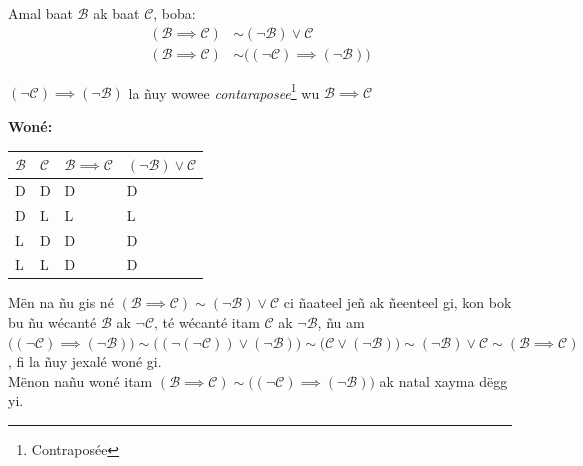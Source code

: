 \documentclass[twoside, a4paper]{article}
\begin{document}
\begin{tcolorbox}[enhanced jigsaw,breakable,pad at break*=1mm, colback=blue!5!white,colframe=white!75!black,title= Tèg\footnote{Proposition},
  watermark color=white]
Amal baat $\mathcal{B}$ ak baat $\mathcal{C}$, boba:
\begin{align*}
    (\mathcal{B} \implies \mathcal{C}) &\sim (\neg\mathcal{B}) \lor \mathcal{C} \\
    (\mathcal{B} \implies \mathcal{C}) &\sim \big( (\neg\mathcal{C}) \implies (\neg \mathcal{B}) \big)
\end{align*} 

$(\neg\mathcal{C}) \implies (\neg \mathcal{B})$ la ñuy wowee \textit{contaraposee}\footnote{Contraposée} wu $\mathcal{B} \implies \mathcal{C}$
\end{tcolorbox}

\textbf{Woné:}

\begin{tabularx}{0.8\textwidth} { 
  | >{\centering\arraybackslash}X 
  | >{\centering\arraybackslash}X 
  | >{\centering\arraybackslash}X 
  | >{\centering\arraybackslash}X |}
 \hline
$\mathcal{B}$&$\mathcal{C}$ & $\mathcal{B}\implies\mathcal{C}$ &$(\neg\mathcal{B}) \lor \mathcal{C}$\\
 \hline
 D  & D & D & D \\
 D  & L & L & L\\
 L  & D & D & D\\
 L  & L & D & D\\
\hline
\end{tabularx}
\vskip 0.5cm
Mën na ñu gis né $(\mathcal{B} \implies \mathcal{C}) \sim (\neg\mathcal{B}) \lor \mathcal{C}$ ci ñaateel jeñ ak ñeenteel gi, kon bok bu ñu wécanté $\mathcal{B}$ ak $\neg \mathcal{C}$, té wécanté itam $\mathcal{C}$ ak $\neg\mathcal{B}$, ñu am $\big( (\neg\mathcal{C}) \implies (\neg \mathcal{B}) \big) \sim \big( (\neg(\neg\mathcal{C})) \lor (\neg\mathcal{B})\big) \sim \big(\mathcal{C} \lor (\neg\mathcal{B}) \big)\sim (\neg\mathcal{B}) \lor \mathcal{C} \sim (\mathcal{B} \implies \mathcal{C})$, fi la ñuy jexalé woné gi.\\

Mënon nañu woné itam 
$(\mathcal{B} \implies \mathcal{C}) \sim \big( (\neg\mathcal{C}) \implies (\neg \mathcal{B}) \big)$ ak natal xayma dëgg yi.
\end{document}
